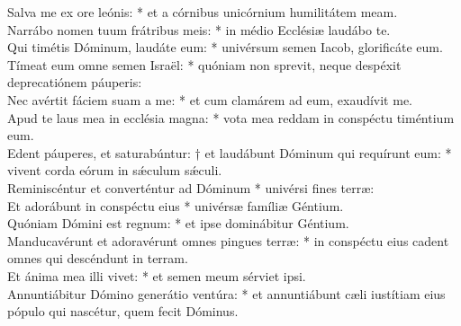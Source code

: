 {	Salva me ex ore leónis: * et a córnibus unicórnium humilitátem meam. \\
	Narrábo nomen tuum frátribus meis: * in médio Ecclésiæ laudábo te. \\
	Qui timétis Dóminum, laudáte eum: * univérsum semen Iacob, glorificáte eum. \\
	Tímeat eum omne semen Israël: * quóniam non sprevit, neque despéxit deprecatiónem páuperis: \\
	Nec avértit fáciem suam a me: * et cum clamárem ad eum, exaudívit me. \\
	Apud te laus mea in ecclésia magna: * vota mea reddam in conspéctu timéntium eum. \\
	Edent páuperes, et saturabúntur: † et laudábunt Dóminum qui requírunt eum: * vivent corda eórum in sǽculum sǽculi. \\
	Reminiscéntur et converténtur ad Dóminum * univérsi fines terræ: \\
	Et adorábunt in conspéctu eius * univérsæ famíliæ Géntium. \\
	Quóniam Dómini est regnum: * et ipse dominábitur Géntium. \\
	Manducavérunt et adoravérunt omnes pingues terræ: * in conspéctu eius cadent omnes qui descéndunt in terram. \\
	Et ánima mea illi vivet: * et semen meum sérviet ipsi. \\
	Annuntiábitur Dómino generátio ventúra: * et annuntiábunt cæli iustítiam eius pópulo qui nascétur, quem fecit Dóminus.
}



